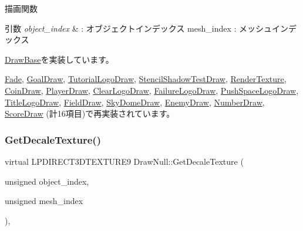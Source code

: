 描画関数 


\begin{DoxyParams}{引数}
{\em object\+\_\+index} & \+: オブジェクトインデックス mesh\+\_\+index \+: メッシュインデックス \\
\hline
\end{DoxyParams}


\mbox{\hyperlink{class_draw_base_a408080106630a1146d7af0bb46a4d8d1}{Draw\+Base}}を実装しています。



\mbox{\hyperlink{class_fade_a84a9e688650ac500e03cde74ff0210b8}{Fade}}, \mbox{\hyperlink{class_goal_draw_a554c826d7a4534ee489dfe18edf7ee0e}{Goal\+Draw}}, \mbox{\hyperlink{class_tutorial_logo_draw_aa808cfb8bc59d58bbd698a195603429f}{Tutorial\+Logo\+Draw}}, \mbox{\hyperlink{class_stencil_shadow_test_draw_abb5f9445b7d94c213a3751fa57e36643}{Stencil\+Shadow\+Test\+Draw}}, \mbox{\hyperlink{class_render_texture_a529ab829c676470ae5764b42cba9efb0}{Render\+Texture}}, \mbox{\hyperlink{class_coin_draw_ac7d91fecb6845cebe276eb81a4953563}{Coin\+Draw}}, \mbox{\hyperlink{class_player_draw_a8b9e8caa6bea7295f58a0aaddeb9458b}{Player\+Draw}}, \mbox{\hyperlink{class_clear_logo_draw_ab018f370071f370ae7016d8ee402c456}{Clear\+Logo\+Draw}}, \mbox{\hyperlink{class_failure_logo_draw_a8ee20e1697bbbaf7f41c18334830488a}{Failure\+Logo\+Draw}}, \mbox{\hyperlink{class_push_space_logo_draw_a647dddefc43d66cb3c720ee8fbb6a783}{Push\+Space\+Logo\+Draw}}, \mbox{\hyperlink{class_title_logo_draw_a01e4cb21d580bac86a226fa2e35bf4a3}{Title\+Logo\+Draw}}, \mbox{\hyperlink{class_field_draw_a1915497654d079074dbd3e058db06a78}{Field\+Draw}}, \mbox{\hyperlink{class_sky_dome_draw_a42364ea42618cbab588d55050edfe95a}{Sky\+Dome\+Draw}}, \mbox{\hyperlink{class_enemy_draw_a20a23c1c5fd5e510d15e8ca27aabd821}{Enemy\+Draw}}, \mbox{\hyperlink{class_number_draw_a15e4e602b3f9372349d0b6ff9e4fc423}{Number\+Draw}}, \mbox{\hyperlink{class_score_draw_a799e71943140a264cedba6002308b976}{Score\+Draw}} (計16項目)で再実装されています。

\mbox{\label{class_draw_null_a8496ed1b1f765a331a8f1704122b8ca4}} 
\subsubsection{\texorpdfstring{Get\+Decale\+Texture()}{GetDecaleTexture()}}
{\footnotesize\ttfamily virtual L\+P\+D\+I\+R\+E\+C\+T3\+D\+T\+E\+X\+T\+U\+R\+E9 Draw\+Null\+::\+Get\+Decale\+Texture (\begin{DoxyParamCaption}\item[{unsigned}]{object\+\_\+index,  }\item[{unsigned}]{mesh\+\_\+index }\end{DoxyParamCaption})\hspace{0.3cm}{\ttfamily [inline]}, {\ttfamily [virtual]}}




